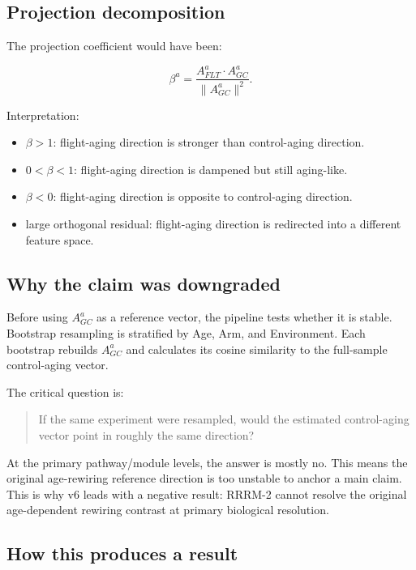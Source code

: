 \documentclass[11pt]{article}
\begin{document}
\subsection{Projection decomposition}

The projection coefficient would have been:

\begin{equation}
\beta^a=\frac{A^a_{FLT}\cdot A^a_{GC}}{\lVert A^a_{GC}\rVert^2}.
\end{equation}

Interpretation:

\begin{itemize}
  \item $\beta>1$: flight-aging direction is stronger than control-aging direction.
  \item $0<\beta<1$: flight-aging direction is dampened but still aging-like.
  \item $\beta<0$: flight-aging direction is opposite to control-aging direction.
  \item large orthogonal residual: flight-aging direction is redirected into a different feature space.
\end{itemize}

\subsection{Why the claim was downgraded}

Before using $A^a_{GC}$ as a reference vector, the pipeline tests whether it is stable. Bootstrap resampling is stratified by Age, Arm, and Environment. Each bootstrap rebuilds $A^a_{GC}$ and calculates its cosine similarity to the full-sample control-aging vector.

The critical question is:

\begin{quote}
If the same experiment were resampled, would the estimated control-aging vector point in roughly the same direction?
\end{quote}

At the primary pathway/module levels, the answer is mostly no. This means the original age-rewiring reference direction is too unstable to anchor a main claim. This is why v6 leads with a negative result: RRRM-2 cannot resolve the original age-dependent rewiring contrast at primary biological resolution.

\subsection{How this produces a result}
\end{document}
